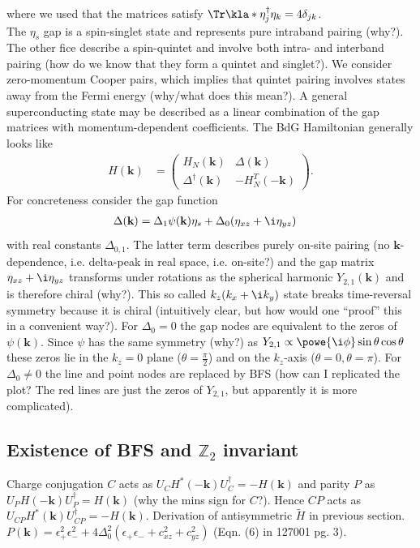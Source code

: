\documentclass[english, parskip=full]{scrartcl}
\newcommand{\qna}[1]{\color{red}#1\color{black}}
\begin{document}
where we used that the matrices satisfy $\Tr\kla*{\eta_j^\dagger \eta_k} = 4\delta_{jk}$.\\
The $\eta_s$ gap is a spin-singlet state and represents pure intraband pairing (\qna{why?}).
The other fice describe a spin-quintet and involve both intra- and interband pairing (\qna{how do we know that they form a quintet and singlet?}).
We consider zero-momentum Cooper pairs, which implies that quintet pairing involves states away from the Fermi energy (\qna{why/what does this mean?}).
A general superconducting state may be described as a linear combination of the gap matrices with momentum-dependent coefficients.
The BdG Hamiltonian generally looks like
\begin{align}
H(\textbf{k}) &= \begin{pmatrix}
H_N(\textbf{k}) & \Delta (\textbf{k}) \\ \Delta^\dagger (\textbf{k}) & -H_N^T(-\textbf{k})
\end{pmatrix}.
\end{align}
For concreteness consider the gap function
\begin{align}
\Delta(\textbf{k}) &= \Delta_1 \psi(\textbf{k}) \eta_s + \Delta_0 (\eta_{xz} + \i \eta_{yz})
\end{align}
with real constants $\Delta_{0,1}$.
The latter term describes purely on-site pairing (\qna{no $\textbf{k}$-dependence, i.e. delta-peak in real space, i.e. on-site?}) and the gap matrix $\eta_{xz} + \i \eta_{yz}$ transforms under rotations as the spherical harmonic $Y_{2,1}(\textbf{k})$ and is therefore chiral (\qna{why?}).
This so called $k_z (k_x+\i k_y)$ state breaks time-reversal symmetry because it is chiral (\qna{intuitively clear, but how would one ``proof'' this in a convenient way?}).
For $\Delta_0=0$ the gap nodes are equivalent to the zeros of $\psi(\textbf{k})$.
Since $\psi$ has the same symmetry (\qna{why?}) as $Y_{2,1} \propto \powe{\i\phi} \sin \theta\cos\theta$ these zeros lie in the $k_z=0$ plane ($\theta = \frac{\pi}{2}$) and on the $k_z$-axis ($\theta=0,\theta=\pi$).
For $\Delta_0\neq 0$ the line and point nodes are replaced by BFS (\qna{how can I replicated the plot? The red lines are just the zeros of $Y_{2,1}$, but apparently it is more complicated}).
\subsection{Existence of BFS and $\mathbb{Z}_2$ invariant}
Charge conjugation $C$ acts as $U_C H^\ast(- \textbf{k}) U_C^\dagger = -H(\textbf{k})$ and parity $P$ as $U_P H(-\textbf{k})U_P^\dagger = H(\textbf{k})$ (\qna{why the mins sign for $C$?}).
Hence $CP$ acts as $U_{CP} H^\ast(\textbf{k})U_{CP}^\dagger = -H(\textbf{k})$.
Derivation of antisymmetric $\tilde{H}$ in previous section.\\
$P(\textbf{k}) = \epsilon_+^2 \epsilon_-^2 + 4\Delta_0^2 (\epsilon_+\epsilon_- + c_{xz}^2 + c_{yz}^2)$ (\qna{Eqn. (6) in 127001 pg. 3}).
\end{document}
